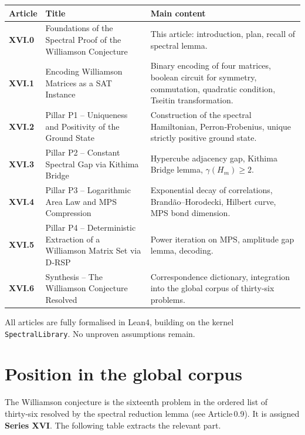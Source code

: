 \documentclass[11pt,a4paper]{article}
\begin{document}
\begin{center}
\small
\begin{tabular}{@{}>{\bfseries}l>{\raggedright\arraybackslash}p{4.5cm}>{\raggedright\arraybackslash}p{6cm}@{}}
\toprule
\textbf{Article} & \textbf{Title} & \textbf{Main content} \\
\midrule
XVI.0 & Foundations of the Spectral Proof of the Williamson Conjecture & This article: introduction, plan, recall of spectral lemma. \\
XVI.1 & Encoding Williamson Matrices as a SAT Instance & Binary encoding of four matrices, boolean circuit for symmetry, commutation, quadratic condition, Tseitin transformation. \\
XVI.2 & Pillar P1 – Uniqueness and Positivity of the Ground State & Construction of the spectral Hamiltonian, Perron‑Frobenius, unique strictly positive ground state. \\
XVI.3 & Pillar P2 – Constant Spectral Gap via Kithima Bridge & Hypercube adjacency gap, Kithima Bridge lemma, $\gamma(H_m)\ge2$. \\
XVI.4 & Pillar P3 – Logarithmic Area Law and MPS Compression & Exponential decay of correlations, Brandão–Horodecki, Hilbert curve, MPS bond dimension. \\
XVI.5 & Pillar P4 – Deterministic Extraction of a Williamson Matrix Set via D‑RSP & Power iteration on MPS, amplitude gap lemma, decoding. \\
XVI.6 & Synthesis – The Williamson Conjecture Resolved & Correspondence dictionary, integration into the global corpus of thirty‑six problems. \\
\bottomrule
\end{tabular}
\normalsize
\end{center}

All articles are fully formalised in Lean4, building on the kernel \texttt{SpectralLibrary}. No unproven assumptions remain.

\section{Position in the global corpus}

The Williamson conjecture is the sixteenth problem in the ordered list of thirty‑six resolved by the spectral reduction lemma (see Article 0.9). It is assigned \textbf{Series XVI}. The following table extracts the relevant part.
\end{document}
